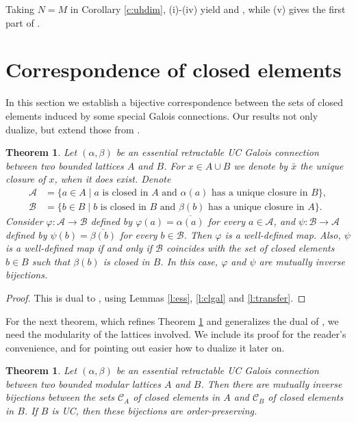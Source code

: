 \documentclass[11pt,a4paper]{amsart}
\newtheorem{thm}[theorem]{Theorem}
\begin{document}
Taking $N=M$ in Corollary \ref{c:uhdim}, (i)-(iv) yield \cite[Propositions~4.10 and 4.11]{AES} and
\cite[Theorem~2.6]{HV}, while (v) gives the first part of \cite[Corollary~1.3]{Z}.

\section{Correspondence of closed elements}

In this section we establish a bijective correspondence between the sets of closed elements induced by some special 
Galois connections. Our results not only dualize, but extend those from \cite{CIKO}. 

\begin{thm} \label{t:main} Let $(\alpha,\beta)$ be an essential retractable UC Galois connection between two bounded
lattices $A$ and $B$. For $x\in A\cup B$ we denote by $\bar{x}$ the unique closure of $x$, when it does exist. Denote
\begin{align*} \mathcal{A}&=\{a\in A\mid a \textrm{ is closed in $A$ and $\alpha(a)$ has a unique closure in $B$}\}, \\ 
\mathcal{B}&=\{b\in B\mid b \textrm{ is closed in $B$ and $\beta(b)$ has a unique closure in $A$}\}.
\end{align*}
Consider $\varphi:\mathcal{A}\to \mathcal{B}$ defined by $\varphi(a)=\overline{\alpha(a)}$ for every $a\in \mathcal{A}$,
and $\psi:\mathcal{B}\to \mathcal{A}$ defined by $\psi(b)=\overline{\beta(b)}$ for every $b\in \mathcal{B}$.
Then $\varphi$ is a well-defined map. Also, $\psi$ is a well-defined map if and only if $\mathcal{B}$ coincides with the
set of closed elements $b\in B$ such that $\beta(b)$ is closed in $B$. In this case, $\varphi$ and $\psi$ are mutually
inverse bijections. 
\end{thm}

\begin{proof} This is dual to \cite[Theorem~3.5]{CIKO}, using Lemmas \ref{l:ess}, \ref{l:clgal} and \ref{l:transfer}.
\end{proof}

For the next theorem, which refines Theorem \ref{t:main} and generalizes the dual of \cite[Theorem~3.6]{CIKO}, we need
the modularity of the lattices involved. We include its proof for the reader's convenience, and for pointing out easier
how to dualize it later on.

\begin{thm} \label{t:main2} Let $(\alpha,\beta)$ be an essential retractable UC Galois connection between two bounded
modular lattices $A$ and $B$. Then there are mutually inverse bijections between the sets $\mathcal{C}_A$ of closed
elements in $A$ and $\mathcal{C}_B$ of closed elements in $B$. If $B$ is UC, then these bijections are order-preserving.
\end{thm}
\end{document}
